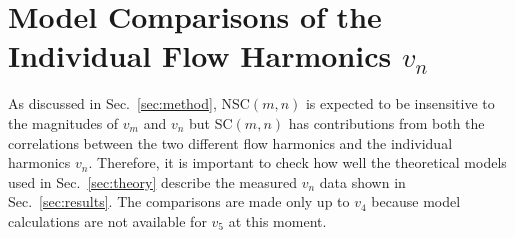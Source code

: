 \appendix
\section{Model Comparisons of the Individual Flow Harmonics $v_n$}
\label{sec:vn}
As discussed in Sec.~\ref{sec:method}, NSC$(m,n)$ is expected to be insensitive to the magnitudes of $v_{m}$ and $v_{n}$ but SC$(m,n)$ has contributions from both the correlations between the two different flow harmonics and the individual harmonics $v_{n}$. Therefore, it is important to check how well the theoretical models used in Sec.~\ref{sec:theory} describe the measured $v_n$ data shown in Sec.~\ref{sec:results}. The comparisons are made only up to $v_4$ because model calculations are not available for $v_5$ at this moment.

\begin{figure}[h]
            \begin{center}
                       \hspace{-0.27cm}

\end{center}
\end{figure}
